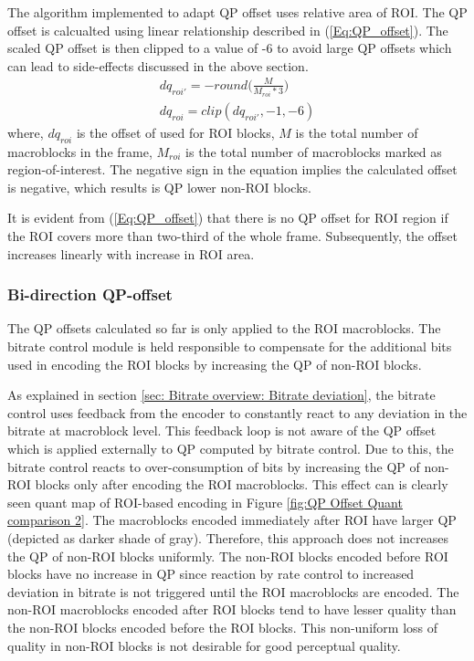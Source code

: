 \documentclass[11pt]{article} %
\begin{document}
The algorithm implemented to adapt QP offset uses relative area of ROI. The QP offset is calcualted using linear relationship described in (\ref{Eq:QP_offset}). The scaled QP offset is then clipped to a value of -6 to avoid large QP offsets which can lead to side-effects discussed in the above section.
\begin{equation}
	\label{Eq:QP_offset}
	\begin{aligned}
	dq_{roi'} = -round\Big(\frac{M}{M_{roi} * 3}\Big) \\
	dq_{roi} = clip(dq_{roi'}, -1 , -6)
	\end{aligned}	
\end{equation}
where, $dq_{roi}$ is the offset of used for ROI blocks, $M$ is the total number of macroblocks in the frame, $M_{roi}$ is the total number of macroblocks marked as region-of-interest. The negative sign in the equation implies the calculated offset is negative, which results is QP lower non-ROI blocks. 

It is evident from (\ref{Eq:QP_offset}) that there is no QP offset for ROI region if the ROI covers more than two-third of the whole frame. Subsequently, the offset increases linearly with increase in ROI area.

\subsubsection{Bi-direction QP-offset}
The QP offsets calculated so far is only applied to the ROI macroblocks. The bitrate control module is held responsible to compensate for the additional bits used in encoding the ROI blocks by increasing the QP of non-ROI blocks. 

As explained in section \ref{sec: Bitrate overview: Bitrate deviation}, the bitrate control uses feedback from the encoder to constantly react to any deviation in the bitrate at macroblock level. This feedback loop is not aware of the QP offset which is applied externally to QP computed by bitrate control. Due to this, the bitrate control reacts to over-consumption of bits by increasing the QP of non-ROI blocks only after encoding the ROI macroblocks. This effect can is clearly seen quant map of ROI-based encoding in Figure \ref{fig:QP Offset Quant comparison 2}. The macroblocks encoded immediately after ROI have larger QP (depicted as darker shade of gray). Therefore, this approach does not increases the QP of non-ROI blocks uniformly. The non-ROI blocks encoded before ROI blocks have no increase in QP since reaction by rate control to increased deviation in bitrate is not triggered until the ROI macroblocks are encoded. The non-ROI macroblocks encoded after ROI blocks tend to have lesser quality than the non-ROI blocks encoded before the ROI blocks. This non-uniform loss of quality in non-ROI blocks is not desirable for good perceptual quality. 
\end{document}
